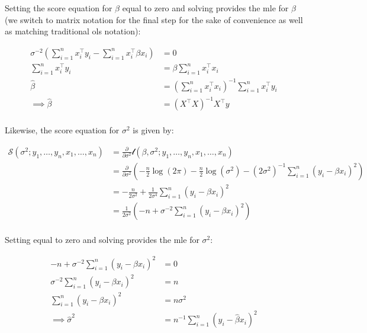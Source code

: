 \documentclass{report}
\begin{document}
Setting the score equation for $\beta$ equal to zero and solving provides the \gls{mle} for $\beta$ (we switch to matrix notation for the final step for the sake of convenience as well as matching traditional \gls{ols} notation):

\begin{equation}\label{eq:ex-ols-beta-mle}
    \begin{aligned}
        \sigma^{-2} \left(\sum_{i=1}^n x_i^\intercal y_i - \sum_{i=1}^n x_i^\intercal \beta x_i\right) &= 0 \\
        \sum_{i=1}^n x_i^\intercal y_i &= \beta \sum_{i=1}^n x_i^\intercal x_i \\
        \hat{\beta} &= \left(\sum_{i=1}^n x_i^\intercal x_i\right)^{-1} \sum_{i=1}^n x_i^\intercal y_i \\
        \implies \hat{\beta} &= \left(X^\intercal X\right)^{-1} X^\intercal y \\
    \end{aligned}
\end{equation}

Likewise, the score equation for $\sigma^2$ is given by:

\begin{equation}\label{eq:ex-ols-model-score-equation-sigma-squared}
    \begin{aligned}
        \mathcal{S}(\sigma^2;y_1, \dots, y_n, x_1, \dots, x_n)
          &= \frac{\partial}{\partial\sigma^2} \mathcal{l}(\beta, \sigma^2;y_1, \dots, y_n, x_1, \dots, x_n) \\
          &= \frac{\partial}{\partial\sigma^2} \left(-\frac{n}{2}\log(2\pi) - \frac{n}{2}\log(\sigma^2) - (2\sigma^2)^{-1} \sum_{i=1}^n (y_i - \beta x_i)^2\right) \\
          &= -\frac{n}{2\sigma^2} + \frac{1}{2\sigma^4} \sum_{i=1}^n (y_i - \beta x_i)^2 \\
          &= \frac{1}{2\sigma^2} \left(-n + \sigma^{-2}\sum_{i=1}^n (y_i - \beta x_i)^2\right) \\
    \end{aligned}
\end{equation}

Setting equal to zero and solving provides the \gls{mle} for $\sigma^2$:

\begin{equation}\label{eq:ex-ols-sigma-squared-mle}
    \begin{aligned}
        -n + \sigma^{-2}\sum_{i=1}^n (y_i - \beta x_i)^2 &= 0 \\
        \sigma^{-2}\sum_{i=1}^n (y_i - \beta x_i)^2 &= n \\
        \sum_{i=1}^n (y_i - \beta x_i)^2 &= n\sigma^2 \\
        \implies \hat{\sigma}^2 &= n^{-1}\sum_{i=1}^n (y_i - \hat{\beta} x_i)^2 \\
    \end{aligned}
\end{equation}
\end{document}
